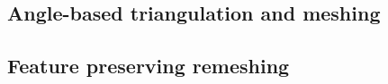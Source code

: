 \documentclass[10pt,journal,cspaper,compsoc]{IEEEtran}
\begin{document}
\subsection{Angle-based triangulation and meshing}

\subsection{Feature preserving remeshing}

\ifCLASSOPTIONcaptionsoff
  \newpage
\fi



\end{document}
